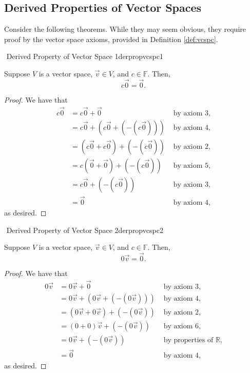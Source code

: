     \subsection{Derived Properties of Vector Spaces}

        Consider the following theorems. While they may seem obvious, they require proof by the vector space axioms, provided in Definition \ref{def:vcspc}.
        \begin{theorem}{\Stop\,\,Derived Property of Vector Space 1}{derpropvcspc1}

            Suppose \(V\) is a vector space, \(\vec{v}\in V\), and \(c\in\mathbb{F}\). Then,
            \begin{equation*}
                c\vec{0}=\vec{0}.
            \end{equation*}
            \begin{proof}
                We have that
                \begin{align*}
                    c\vec{0}&=c\vec{0}+\vec{0} &\text{ by axiom \(3\),} \\
                    &=c\vec{0}+(c\vec{0}+(-(c\vec{0}))) &\text{ by axiom \(4\),} \\
                    &=(c\vec{0}+c\vec{0})+(-(c\vec{0})) &\text{ by axiom \(2\),} \\
                    &=c(\vec{0}+\vec{0})+(-(c\vec{0})) &\text{ by axiom \(5\),} \\
                    &=c\vec{0}+(-(c\vec{0})) &\text{ by axiom \(3\),} \\
                    &=\vec{0} &\text{ by axiom \(4\),} 
                \end{align*}
                as desired.
            \end{proof}
        \end{theorem}
        \begin{theorem}{\Stop\,\,Derived Property of Vector Space 2}{derpropvcspc2}

            Suppose \(V\) is a vector space, \(\vec{v}\in V\), and \(c\in\mathbb{F}\). Then,
            \begin{equation*}
                0\vec{v}=\vec{0}.
            \end{equation*}
            \begin{proof}
                We have that
                \begin{align*}
                    0\vec{v}&=0\vec{v}+\vec{0} &\text{ by axiom \(3\),} \\
                    &=0\vec{v}+(0\vec{v}+(-(0\vec{v}))) &\text{ by axiom \(4\),} \\
                    &=(0\vec{v}+0\vec{v})+(-(0\vec{v})) &\text{ by axiom \(2\),} \\
                    &=(0+0)\vec{v}+(-(0\vec{v})) &\text{ by axiom \(6\),} \\
                    &=0\vec{v}+(-(0\vec{v})) &\text{ by properties of \(\mathbb{R}\),} \\
                    &=\vec{0} &\text{ by axiom \(4\),}
                \end{align*}
                as desired.
            \end{proof}
        \end{theorem}
